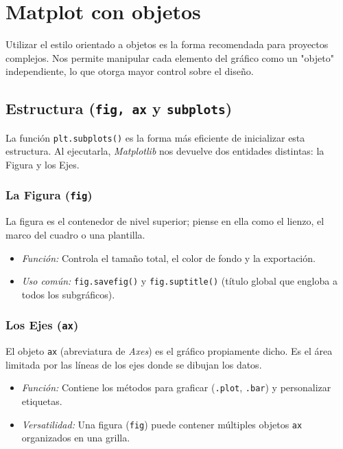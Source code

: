 \section{Matplot con objetos}

Utilizar el estilo orientado a objetos es la forma recomendada para proyectos complejos. Nos permite manipular cada elemento del gráfico como un "objeto" independiente, lo que otorga mayor control sobre el diseño.

\subsection{Estructura (\texttt{fig, ax} y \texttt{subplots})}

La función \texttt{plt.subplots()} es la forma más eficiente de inicializar esta estructura. Al ejecutarla, \textit{Matplotlib} nos devuelve dos entidades distintas: la Figura y los Ejes.

\subsubsection{La Figura (\texttt{fig})}

La figura es el contenedor de nivel superior; piense en ella como el lienzo, el marco del cuadro o una plantilla.
\begin{itemize}
\item \textit{Función:} Controla el tamaño total, el color de fondo y la exportación.
\item \textit{Uso común:} \texttt{fig.savefig()} y \texttt{fig.suptitle()} (título global que engloba a todos los subgráficos).
\end{itemize}

\subsubsection{Los Ejes (\texttt{ax})}

El objeto \texttt{ax} (abreviatura de \textit{Axes}) es el gráfico propiamente dicho. Es el área limitada por las líneas de los ejes donde se dibujan los datos.
\begin{itemize}
\item \textit{Función:} Contiene los métodos para graficar (\texttt{.plot}, \texttt{.bar}) y personalizar etiquetas.
\item \textit{Versatilidad:} Una figura (\texttt{fig}) puede contener múltiples objetos \texttt{ax} organizados en una grilla.
\end{itemize}


